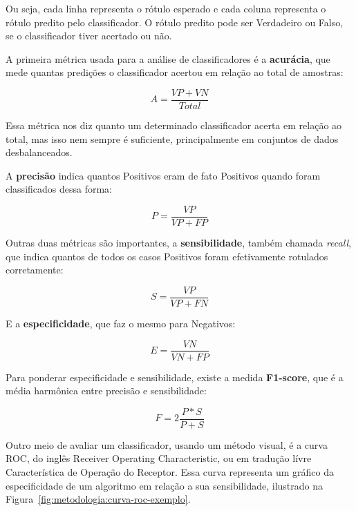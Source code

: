 Ou seja, cada linha representa o rótulo esperado e cada coluna representa o rótulo predito pelo classificador. O rótulo predito pode ser Verdadeiro ou Falso, se o classificador tiver acertado ou não.

A primeira métrica usada para a análise de classificadores é a \textbf{acurácia}, que mede quantas predições o classificador acertou em relação ao total de amostras:

\begin{equation}
    A = \frac{VP+VN}{Total}
\end{equation}

Essa métrica nos diz quanto um determinado classificador acerta em relação ao total, mas isso nem sempre é suficiente, principalmente em conjuntos de dados desbalanceados.

A \textbf{precisão} indica quantos Positivos eram de fato Positivos quando foram classificados dessa forma:

\begin{equation}
    P = \frac{VP}{VP+FP}
\end{equation}

Outras duas métricas são importantes, a \textbf{sensibilidade}, também chamada \textit{recall}, que indica quantos de todos os casos Positivos foram efetivamente rotulados corretamente:

\begin{equation}
    S = \frac{VP}{VP+FN}
\end{equation}

E a \textbf{especificidade}, que faz o mesmo para Negativos:

\begin{equation}
    E = \frac{VN}{VN+FP}
\end{equation}

Para ponderar especificidade e sensibilidade, existe a medida \textbf{F1-score}, que é a média harmônica entre precisão e sensibilidade:

\begin{equation}
    F = 2\frac{P*S}{P+S}
\end{equation}

Outro meio de avaliar um classificador, usando um método visual, é a curva ROC, do inglês Receiver Operating Characteristic, ou em tradução lívre Característica de Operação do Receptor. Essa curva representa um gráfico da especificidade de um algoritmo em relação a sua sensibilidade, ilustrado na Figura~\ref{fig:metodologia:curva-roc-exemplo}.

